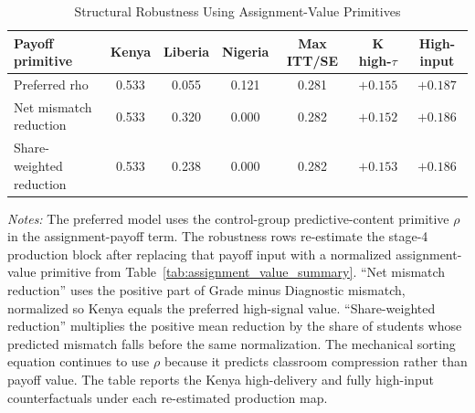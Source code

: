 \begin{table}[H]
\centering
\caption{Structural Robustness Using Assignment-Value Primitives}
\label{tab:struct_assignment_value_sensitivity}
\begin{threeparttable}
\footnotesize
\begin{tabular}[t]{lcccccc}
\toprule
Payoff primitive & Kenya & Liberia & Nigeria & Max ITT/SE & K high-$\tau$ & High-input \\
\midrule
Preferred rho & 0.533 & 0.055 & 0.121 & 0.281 & $+0.155$ & $+0.187$ \\
Net mismatch reduction & 0.533 & 0.320 & 0.000 & 0.282 & $+0.152$ & $+0.186$ \\
Share-weighted reduction & 0.533 & 0.238 & 0.000 & 0.282 & $+0.153$ & $+0.186$ \\
\bottomrule
\end{tabular}
\begin{tablenotes}
\footnotesize
\item \textit{Notes:} The preferred model uses the control-group predictive-content primitive $\rho$ in the assignment-payoff term. The robustness rows re-estimate the stage-4 production block after replacing that payoff input with a normalized assignment-value primitive from Table~\ref{tab:assignment_value_summary}. ``Net mismatch reduction'' uses the positive part of Grade minus Diagnostic mismatch, normalized so Kenya equals the preferred high-signal value. ``Share-weighted reduction'' multiplies the positive mean reduction by the share of students whose predicted mismatch falls before the same normalization. The mechanical sorting equation continues to use $\rho$ because it predicts classroom compression rather than payoff value. The table reports the Kenya high-delivery and fully high-input counterfactuals under each re-estimated production map.
\end{tablenotes}
\end{threeparttable}
\end{table}
